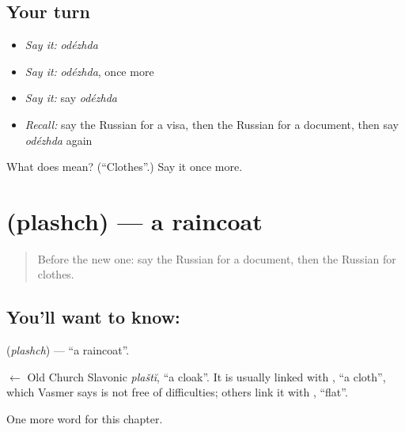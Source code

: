 \subsection*{Your turn}
\begin{itemize}
\raggedright
  \item \emph{Say it:} \emph{odézhda}
  \item \emph{Say it:} \emph{odézhda}, once more
  \item \emph{Say it:} say \emph{odézhda}
  \item \emph{Recall:} say the Russian for a visa, then the Russian for a document, then say \emph{odézhda} again
\end{itemize}

\begin{tcolorbox}[breakable,colback=teal!4,colframe=teal!35!black,title={Before you move on}]
What does  mean? (\textquotedblleft{}Clothes\textquotedblright{}.) Say it once more.
\end{tcolorbox}
\section[\texorpdfstring{\ru{плащ} (plashch)}{плащ (plashch)}]{ (plashch) — a raincoat}

\label{lesson:RU-C248-plashch}



\begin{quote}
Before the new one: say the Russian for a document, then the Russian for clothes.
\end{quote}

\subsection*{You'll want to know: }
\textbf{} (\emph{plashch}) — \textquotedblleft{}a raincoat\textquotedblright{}.

\begin{cousinweb}
\textbf{} $\leftarrow$ Old Church Slavonic \emph{plaštĭ}, \textquotedblleft{}a cloak\textquotedblright{}. It is usually linked with \emph{}, \textquotedblleft{}a cloth\textquotedblright{}, which Vasmer says is not free of difficulties; others link it with \emph{}, \textquotedblleft{}flat\textquotedblright{}.
\end{cousinweb}

\begin{grammarlens}[title={What you've built}]
One more word for this chapter.
\end{grammarlens}

